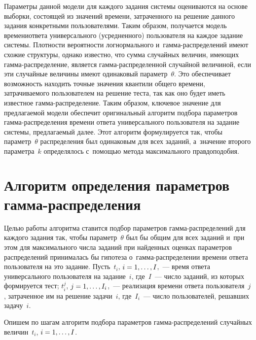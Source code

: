 \begin{multicols}{2}
Параметры данной модели для каждого задания\linebreak 
системы оце\-ни\-ва\-ют\-ся на основе выборки, со\-сто\-ящей 
из значений времени, затраченного на 
решение данного задания конкретными пользователями. Таким образом, 
получается модель времени\linebreak ответа универсального (усредненного) 
пользователя на каждое задание системы. Плотности вероятности 
логнормального и~гам\-ма-рас\-пре\-де\-ле\-ний имеют схожие структуры, 
однако известно, что сумма случайных величин, имеющих 
гам\-ма-рас\-пре\-де\-ле\-ние, является гам\-ма-рас\-пре\-де\-лен\-ной 
случайной величиной, если эти 
случайные величины имеют одинаковый параметр~$\theta$. Это обеспечивает 
возможность находить точные значения квантили общего времени, 
затрачиваемого пользователем на решение теста, так как оно будет иметь 
известное гам\-ма-рас\-пре\-де\-ле\-ние. Таким образом, ключевое значение для 
предлагаемой модели обеспечит оригинальный алгоритм подбора параметров 
гам\-ма-рас\-пре\-де\-ле\-ния времени ответа универсального пользователя на задание 
системы, предлагаемый далее. Этот алгоритм формулируется так, чтобы 
параметр~$\theta$ распределения был одинаковым для всех заданий, а~значение 
второго параметра~$k$ определялось с~помощью метода максимального 
правдоподобия.

\vspace*{-6pt}

\section{Алгоритм определения параметров  
гамма-распределения}

\vspace*{-2pt}

    Целью работы алгоритма ставится подбор параметров  
гам\-ма-рас\-пре\-де\-ле\-ний для каждого задания так, чтобы параметр~$\theta$ 
был бы общим для всех заданий и~при этом для максимального чис\-ла заданий 
при найденных оценках параметров распределений принималась бы гипотеза 
о~гам\-ма-рас\-пре\-де\-ле\-нии времени ответа пользователя на это задание. Пусть~$t_i$, 
$i\hm= 1,\ldots , I$,~--- время ответа универсального пользователя на 
задание~$i$, где~$I$~--- число заданий, из которых формируется тест; $t_i^j$, 
$j\hm=1, \ldots , I_i$,~--- реализация времени ответа пользователя~$j$, 
затраченное им на решение задачи~$i$, где~$I_i$~--- чис\-ло пользователей, 
решавших задачу~$i$.
    
    Опишем по шагам алгоритм подбора па\-ра\-мет\-ров 
гам\-ма-рас\-пре\-де\-ле\-ний случайных величин~$t_i$, $i\hm= 1,\ldots , I$.
    

\end{multicols}

